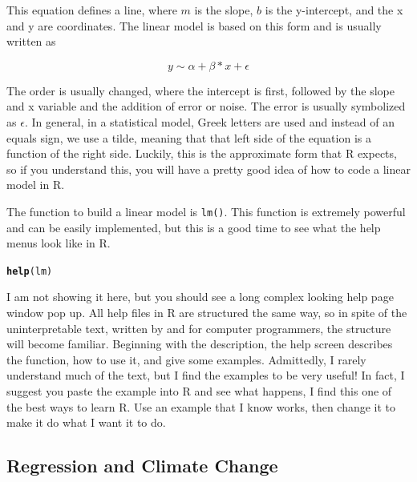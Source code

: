 \documentclass{article}\usepackage[]{graphicx}\usepackage[]{color}
\makeatletter
\newcommand{\hlstd}[1]{\textcolor[rgb]{0.345,0.345,0.345}{#1}}%
\newcommand{\hlkwd}[1]{\textcolor[rgb]{0.737,0.353,0.396}{\textbf{#1}}}%
\newenvironment{kframe}{%
 \def\at@end@of@kframe{}%
 \ifinner\ifhmode%
  \def\at@end@of@kframe{\end{minipage}}%
  \begin{minipage}{\columnwidth}%
 \fi\fi%
 \def\FrameCommand##1{\hskip\@totalleftmargin \hskip-\fboxsep
 \colorbox{shadecolor}{##1}\hskip-\fboxsep
     \hskip-\linewidth \hskip-\@totalleftmargin \hskip\columnwidth}%
 \MakeFramed {\advance\hsize-\width
   \@totalleftmargin\z@ \linewidth\hsize
   \@setminipage}}%
 {\par\unskip\endMakeFramed%
 \at@end@of@kframe}
\newenvironment{knitrout}{}{} %
\makeatother
\begin{document}
This equation defines a line, where $m$ is the slope, $b$ is the y-intercept, and the x and y are coordinates. The linear model is based on this form and is usually written as  

\begin{equation}
y \sim \alpha + \beta * x + \epsilon
\end{equation}

The order is usually changed, where the intercept is first, followed by the slope and x variable and the addition of error or noise. The error is usually symbolized as $\epsilon$. In general, in a statistical model, Greek letters are used and instead of an equals sign, we use a tilde, meaning that that left side of the equation is a function of the right side. Luckily, this is the approximate form that R expects, so if you understand this, you will have a pretty good idea of how to code a linear model in R. 

The function to build a linear model is \texttt{lm()}. This function is extremely powerful and can be easily implemented, but this is a good time to see what the help menus look like in R. 

\begin{knitrout}
\color{fgcolor}\begin{kframe}
\begin{alltt}
\hlkwd{help}\hlstd{(lm)}
\end{alltt}
\end{kframe}
\end{knitrout}

I am not showing it here, but you should see a long complex looking help page window pop up. All help files in R are structured the same way, so in spite of the uninterpretable text, written by and for computer programmers, the structure will become familiar. Beginning with the description, the help screen describes the function, how to use it, and give some examples. Admittedly, I rarely understand much of the text, but I find the examples to be very useful! In fact, I suggest you paste the example into R and see what happens, I find this one of the best ways to learn R. Use an example that I know works, then change it to make it do what I want it to do.

\subsection{Regression and Climate Change}
\end{document}
